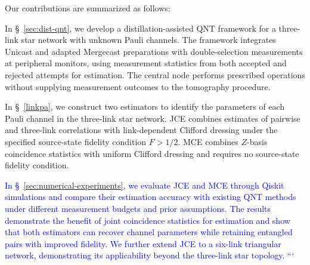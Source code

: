 Our contributions are summarized as follows:
\begin{itemize}
    \item In \S~\ref{sec:dist-qnt}, we develop a distillation-assisted QNT framework for a
    three-link star network with unknown Pauli channels. The framework
    integrates Unicast and adapted Mergecast preparations with
    double-selection measurements at peripheral monitors, using
    measurement statistics from both accepted and rejected attempts for estimation.
    The central node performs prescribed operations without supplying
    measurement outcomes to the tomography procedure.

\item In \S~\ref{linkpa}, we construct two estimators to identify
the parameters of each Pauli channel in the three-link star network.
JCE combines estimates of pairwise and three-link correlations
with link-dependent Clifford dressing under the specified
source-state fidelity condition $F>1/2$.
MCE combines $Z$-basis coincidence statistics with uniform
Clifford dressing and requires no source-state fidelity condition.
\textcolor{blue}{
\item In \S~\ref{sec:numerical-experiments}, we evaluate JCE and MCE through
Qiskit simulations and compare their estimation accuracy
with existing QNT methods under different measurement
budgets and prior assumptions. The results demonstrate
the benefit of joint coincidence statistics for estimation
and show that both estimators can recover channel parameters
while retaining entangled pairs with improved fidelity.
We further extend JCE to a six-link triangular network,
demonstrating its applicability beyond the three-link
star topology.
```}

\end{itemize}


